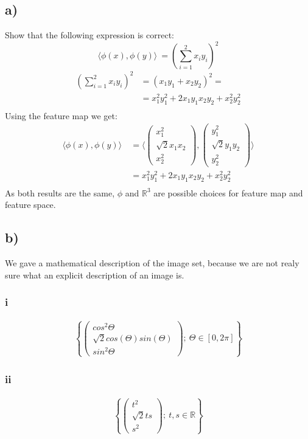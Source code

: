 \documentclass{article}
\newcommand{\R}[0]{\mathbb{R}}
\begin{document}
\subsection*{a)}
Show that the following expression is correct:
\begin{equation}
    \langle{}\phi(x), \phi(y)\rangle{}~= \left(\sum_{i=1}^2 x_i y_i \right)^2
\end{equation}
\begin{align}
    \left(\sum_{i=1}^2 x_i y_i \right)^2 &= \left(x_1 y_1 + x_2 y_2 \right)^2 = \\
    & = x_1^2 y_1^2 + 2 x_1 y_1 x_2 y_2 + x_2^2 y_2^2  \\
\end{align}
Using the feature map we get:
\begin{align}
    \langle{}\phi(x), \phi(y)\rangle{}~ &= \langle{}
        \begin{pmatrix}x_1^2 \\ \sqrt{2} x_1 x_2 \\ x_2^2 \end{pmatrix},
        \begin{pmatrix}y_1^2 \\ \sqrt{2} y_1 y_2 \\ y_2^2 \end{pmatrix} \rangle{} \\
    & = x_1^2 y_1^2 + 2 x_1 y_1 x_2 y_2 + x_2^2 y_2^2  \\
\end{align}
As both results are the same, $\phi$ and $\R^3$ are possible choices for feature map
and feature space.

\subsection*{b)}
We gave a mathematical description of the image set, because we are not realy sure what an explicit description of an image is.
\subsubsection*{i}
\begin{gather*}
\left\{ \left( \begin{array}{c}cos^2 \Theta \\ \sqrt{2} cos(\Theta) sin(\Theta) \\ sin^2 \Theta \end{array} \right); \ \Theta \in [0, 2\pi] \right\}
\end{gather*}
\subsubsection*{ii}
\begin{gather*}
\left\{ \left( \begin{array}{c}t^2 \\ \sqrt{2} t s \\ s^2 \end{array} \right); \ t,s \in \R \right\} 
\end{gather*}
\end{document}
